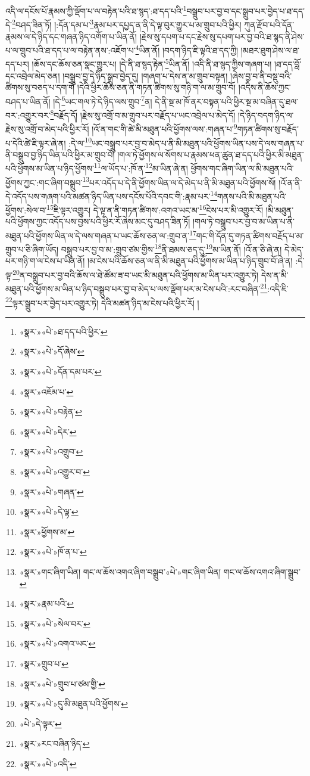 འདི་ལ་དངོས་པོ་རྣམས་ཀྱི་ལྡོག་པ་ལ་བརྟེན་པའི་ཐ་སྙད་:ཐ་དད་པའི་\footnote{«སྣར་»«པེ་»ཐ་དད་པའི་ཕྱིར་}བསྒྲུབ་པར་བྱ་བ་དང་སྒྲུབ་པར་བྱེད་པ་ཐ་དད་དེ་\footnote{«སྣར་»«པེ་»དོ་ཞེས་}བཤད་ཟིན་ཏོ། །:དོན་དམ་པ་\footnote{«སྣར་»«པེ་»དོན་དམ་པར་}རྣམ་པར་དཔྱད་ན་ནི་དེ་ལྟ་བུར་གྱུར་པ་མ་གྲུབ་པའི་ཕྱིར། ཀུན་རྫོབ་པའི་དོན་རྣམས་ལ་དེ་ཉིད་དང་གཞན་ཉིད་འགོག་པ་ཡིན་ནོ། །རྗེས་སུ་དཔག་པ་དང་རྗེས་སུ་དཔག་པར་བྱ་བའི་ཐ་སྙད་ནི་ཤེས་པ་ལ་གྲུབ་པའི་ཐ་དད་པ་ལ་བརྟེན་ནས་:འཇོག་པ་\footnote{«སྣར་»འཇོམ་པ་}ཡིན་ནོ། །བདག་ཉིད་ཇི་ལྟའི་ཐ་དད་ཀྱི། །མཐར་ཐུག་ཤེས་ལ་ཐ་དད་པར། །ཆོས་དང་ཆོས་ཅན་སྣང་གྱུར་པ། །དེ་ནི་ཐ་སྙད་རྟེན་\footnote{«སྣར་»«པེ་»བརྟེན་}ཡིན་ནོ། །འདི་ནི་ཐ་སྙད་ཀྱིས་གཞག་པ། །ཐ་དད་བློ་དང་འབྲེལ་མེད་ཅན། །བསྒྲུབ་བྱ་དེ་ཉིད་སྒྲུབ་བྱེད་དུ། །གཞག་པ་དེས་ན་མ་གྲུབ་བསྟན། །ཞེས་བྱ་བ་ནི་བསྡུ་བའི་ཚིགས་སུ་བཅད་པ་དག་གོ །དེའི་ཕྱིར་ཆོས་ཅན་ནི་གཏན་ཚིགས་སུ་གཉི་ག་ལ་མ་གྲུབ་བོ། །འདིས་ནི་ཆོས་ཀྱང་བཤད་པ་ཡིན་ནོ། །དེ་\footnote{«སྣར་»«པེ་»དེར་}ཡང་གལ་ཏེ་དེ་ཉིད་ལས་གྲུབ་\footnote{«སྣར་»«པེ་»འགྲུབ་}ན། དེ་ནི་སྔ་མ་ཁོ་ནར་བསྟན་པའི་ཕྱིར་སྔ་མ་བཞིན་དུ་ཐལ་བར་:འགྱུར་བར་\footnote{«སྣར་»«པེ་»འགྱུར་བ་}བརྗོད་དོ། །རྗེས་སུ་འགྲོ་བ་མ་གྲུབ་པར་བརྗོད་པ་ཡང་འབྲེལ་པ་མེད་དོ། །དེ་ཉིད་བདག་ཉིད་ལ་རྗེས་སུ་འགྲོ་བ་མེད་པའི་ཕྱིར་རོ། །འོ་ན་གང་གི་ཚེ་མི་མཐུན་པའི་ཕྱོགས་ལས་:གཞན་པ་\footnote{«སྣར་»«པེ་»གཞན་}གཏན་ཚིགས་སུ་བརྗོད་པ་དེའི་ཚེ་ཇི་ལྟར་ཞེ་ན། :དེ་ལ་\footnote{«སྣར་»«པེ་»དེ་ལྟ་}ཡང་བསྒྲུབ་པར་བྱ་བ་མེད་པ་ནི་མི་མཐུན་པའི་ཕྱོགས་ཡིན་པས་དེ་ལས་གཞན་པ་ནི་བསྒྲུབ་བྱ་ཉིད་ཡིན་པའི་ཕྱིར་མ་གྲུབ་བོ། །གལ་ཏེ་ཕྱོགས་ལ་སོགས་པ་རྣམས་ཕན་ཚུན་ཐ་དད་པའི་ཕྱིར་མི་མཐུན་པའི་ཕྱོགས་མ་ཡིན་པ་ཉིད་ཕྱོགས་\footnote{«སྣར་»ཕྱོགས་མ་}ལ་ཡོད་པ་:ཁོ་ན་\footnote{«སྣར་»«པེ་»ཁོ་ན་པ་}མ་ཡིན་ཞེ་ན། ཕྱོགས་གང་ཞིག་ཡིན་ལ་མི་མཐུན་པའི་ཕྱོགས་ཀྱང་:གང་ཞིག་བསྒྲུབ་\footnote{«སྣར་»གང་ཞིག་ཡིན། གང་ལ་ཆོས་འགའ་ཞིག་བསྒྲུབ་«པེ་»གང་ཞིག་ཡིན། གང་ལ་ཆོས་འགའ་ཞིག་སྒྲུབ་}པར་འདོད་པ་དེ་ནི་ཕྱོགས་ཡིན་ལ་དེ་མེད་པ་ནི་མི་མཐུན་པའི་ཕྱོགས་སོ། །འོ་ན་ནི་དེ་འདོད་པས་གཞག་པའི་མཚན་ཉིད་ཡིན་པས་དངོས་པོའི་དབང་གི་:རྣམ་པར་\footnote{«སྣར་»རྣམ་པའི་}གནས་པའི་མི་མཐུན་པའི་ཕྱོགས་:སེལ་བ་\footnote{«སྣར་»«པེ་»སེལ་བར་}ཇི་ལྟར་འགྱུར། དེ་ལྟ་ན་ནི་གཏན་ཚིགས་:འགའ་ཡང་མ་\footnote{«སྣར་»«པེ་»འགའ་ཡང་}ངེས་པར་མི་འགྱུར་རོ། །མི་མཐུན་པའི་ཕྱོགས་ཀྱང་འདོད་པས་བྱས་པའི་ཕྱིར་རོ་ཞེས་མང་དུ་བཤད་ཟིན་ཏོ། །གལ་ཏེ་བསྒྲུབ་པར་བྱ་བ་མ་ཡིན་པ་ནི་མཐུན་པའི་ཕྱོགས་ཡིན་ལ་དེ་ལས་གཞན་པ་ཡང་ཆོས་ཅན་ལ་:གྲུབ་ན་\footnote{«སྣར་»གྲུབ་པ་}གང་གི་དོན་དུ་གཏན་ཚིགས་བརྗོད་པ་མ་གྲུབ་པ་ཅི་ཞིག་ཡོད། བསྒྲུབ་པར་བྱ་བ་མ་:གྲུབ་ཙམ་གྱིས་\footnote{«སྣར་»«པེ་»གྲུབ་པ་ཙམ་གྱི་}ནི་ཐམས་ཅད་དུ་\footnote{«སྣར་»«པེ་»དུ་མི་མཐུན་པའི་ཕྱོགས་}མ་ཡིན་ནོ། །འོ་ན་ཅི་ཞེ་ན། དེ་མེད་པར་གཉི་ག་ལ་ངེས་པ་ཡིན་ནོ། །མ་ངེས་པའི་ཆོས་ཅན་ལ་ནི་མི་མཐུན་པའི་ཕྱོགས་མ་ཡིན་པ་ཉིད་གྲུབ་བོ་ཞེ་ན། :དེ་ལྟ་\footnote{«པེ་»དེ་ལྟར་}ན་བསྒྲུབ་པར་བྱ་བའི་ཆོས་ལ་ཐེ་ཚོམ་ཟ་བ་ཡང་མི་མཐུན་པའི་ཕྱོགས་མ་ཡིན་པར་འགྱུར་ཏེ། དེས་ན་མི་མཐུན་པའི་ཕྱོགས་མ་ཡིན་པ་ཉིད་བསྒྲུབ་པར་བྱ་བ་མེད་པ་ལས་ལྡོག་པར་མ་ངེས་པའི་:རང་བཞིན་\footnote{«སྣར་»རང་བཞིན་ཉིད་}:འདི་ཇི་\footnote{«སྣར་»«པེ་»འདི་}ལྟར་སྒྲུབ་པར་བྱེད་པར་འགྱུར་ཏེ། དེའི་མཚན་ཉིད་མ་ངེས་པའི་ཕྱིར་རོ། །
